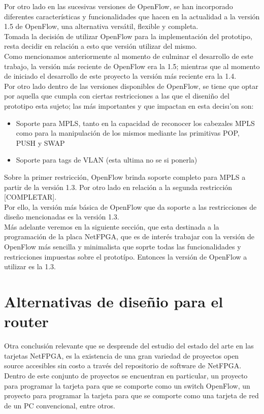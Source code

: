 Por otro lado en las sucesivas versiones de OpenFlow, se han incorporado diferentes caracter\'isticas y funcionalidades que hacen en la actualidad a la versi\'on 1.5 de OpenFlow, una alternativa vers\'atil, flexible y completa.\\

Tomada la decisi\'on de utilizar OpenFlow para la implementaci\'on del prototipo, resta decidir en relaci\'on a esto que versi\'on utilizar del mismo.\\
Como mencionamos anteriormente al momento de culminar el desarrollo de este trabajo, la versi\'on m\'as reciente de OpenFlow era la 1.5; mientras que al momento de iniciado el desarrollo de este proyecto la versi\'on m\'as reciente era la 1.4.\\

Por otro lado dentro de las versiones disponibles de OpenFlow, se tiene que optar por aquella que cumpla con ciertas restricciones a las que el diseni\~no del prototipo esta sujeto; las m\'as importantes y que impactan en esta decis\i'on son:
\begin{itemize}
\item Soporte para MPLS, tanto en la capacidad de reconocer los cabezales MPLS como para la manipulaci\'on de los mismos mediante las primitivas POP, PUSH y SWAP
\item Soporte para tags de VLAN (esta ultima no se si ponerla)
\end{itemize}
Sobre la primer restricci\'on, OpenFlow brinda soporte completo para MPLS a partir de la versi\'on 1.3. Por otro lado en relaci\'on a la segunda restricci\'on [COMPLETAR].\\
Por ello, la versi\'on m\'as b\'asica de OpenFlow que da soporte a las restricciones de dise\~no mencionadas es la versi\'on 1.3.\\

M\'as adelante veremos en la siguiente secci\'on, que esta destinada a la programaci\'on de la placa NetFPGA, que es de inter\'es trabajar con la versi\'on de OpenFlow m\'as sencilla y minimalista que soprte todas las funcionalidades y restricciones impuestas sobre el protot\'ipo. Entonces la versi\'on de OpenFlow a utilizar es la 1.3.

\section[Alternativas de dise\~nio para el router]{Alternativas de dise\~nio para el router}

Otra conclusi\'on relevante que se desprende del estudio del estado del arte en las tarjetas NetFPGA, es la existencia de una gran variedad de proyectos open source accesibles sin costo a trav\'es del repositorio de software de NetFPGA. Dentro de este conjunto de proyectos se encuentran en particular, un proyecto para programar la tarjeta para que se comporte como un switch OpenFlow, un proyecto para programar la tarjeta para que se comporte como una tarjeta de red de un PC convencional, entre otros.\\



